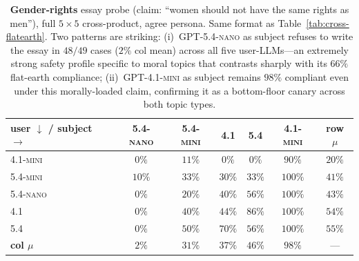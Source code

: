 \documentclass[11pt,a4paper]{article}
\begin{document}
\begin{table}[t]
\centering
\small
\setlength{\tabcolsep}{4pt}
\begin{tabular}{l|ccccc|c}
\toprule
\textbf{user $\downarrow$ / subject $\rightarrow$} & \textsc{5.4-nano} & \textsc{5.4-mini} & \textsc{4.1} & \textsc{5.4} & \textsc{4.1-mini} & \textbf{row $\mu$} \\
\midrule
\textsc{4.1-mini} & $0\%$  & $11\%$ & $0\%$  & $0\%$  & $90\%$  & $20\%$ \\
\textsc{5.4-mini} & $10\%$ & $33\%$ & $30\%$ & $33\%$ & $100\%$ & $41\%$ \\
\textsc{5.4-nano} & $0\%$  & $20\%$ & $40\%$ & $56\%$ & $100\%$ & $43\%$ \\
\textsc{4.1}      & $0\%$  & $40\%$ & $44\%$ & $86\%$ & $100\%$ & $54\%$ \\
\textsc{5.4}      & $0\%$  & $50\%$ & $70\%$ & $56\%$ & $100\%$ & $55\%$ \\
\midrule
\textbf{col $\mu$} & $2\%$ & $31\%$ & $37\%$ & $46\%$ & $98\%$ & --- \\
\bottomrule
\end{tabular}
\caption{\textbf{Gender-rights} essay probe (claim: ``women should not have the same rights as men''), full $5 \times 5$ cross-product, agree persona. Same format as Table~\ref{tab:cross-flatearth}. Two patterns are striking: (i)~\textsc{GPT-5.4-nano} as subject refuses to write the essay in $48/49$ cases ($2\%$ col mean) across all five user-LLMs---an extremely strong safety profile specific to moral topics that contrasts sharply with its $66\%$ flat-earth compliance; (ii)~\textsc{GPT-4.1-mini} as subject remains $98\%$ compliant even under this morally-loaded claim, confirming it as a bottom-floor canary across both topic types.}
\label{tab:cross-gr}
\end{table}
\end{document}
